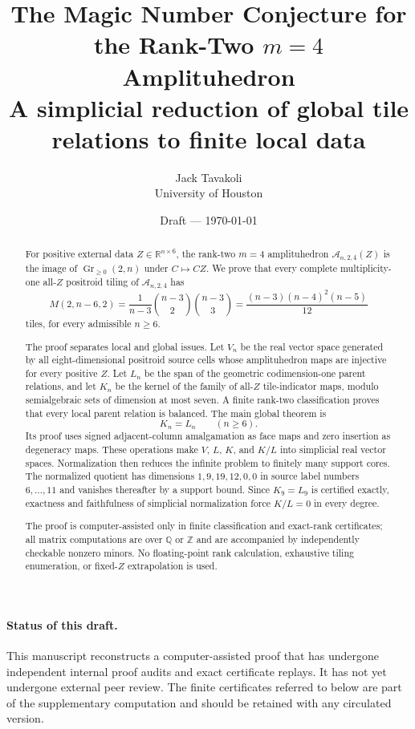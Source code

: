 \documentclass[11pt]{article}
\title{The Magic Number Conjecture for the Rank-Two $m=4$ Amplituhedron\\
\large A simplicial reduction of global tile relations to finite local data}
\author{Jack Tavakoli\\University of Houston}
\date{Draft --- \today}
\newcommand{\Gr}{\operatorname{Gr}}
\newcommand{\A}{\mathcal A}
\newcommand{\R}{\mathbb R}
\newcommand{\1}{\mathbf 1}
\begin{document}
\maketitle

\begin{abstract}
For positive external data $Z\in\R^{n\times 6}$, the rank-two $m=4$
amplituhedron $\A_{n,2,4}(Z)$ is the image of $\Gr_{\ge 0}(2,n)$ under
$C\mapsto CZ$.  We prove that every complete multiplicity-one all-$Z$
positroid tiling of $\A_{n,2,4}$ has
\[
M(2,n-6,2)
=\frac{1}{n-3}\binom{n-3}{2}\binom{n-3}{3}
=\frac{(n-3)(n-4)^2(n-5)}{12}
\]
tiles, for every admissible $n\ge 6$.

The proof separates local and global issues.  Let $V_n$ be the real vector
space generated by all eight-dimensional positroid source cells whose
amplituhedron maps are injective for every positive $Z$.  Let $L_n$ be the
span of the geometric codimension-one parent relations, and let $K_n$ be
the kernel of the family of all-$Z$ tile-indicator maps, modulo
semialgebraic sets of dimension at most seven.  A finite rank-two
classification proves that every local parent relation is balanced.  The
main global theorem is
\[
K_n=L_n\qquad(n\ge 6).
\]
Its proof uses signed adjacent-column amalgamation as face maps and zero
insertion as degeneracy maps.  These operations make $V$, $L$, $K$, and
$K/L$ into simplicial real vector spaces.  Normalization then reduces the
infinite problem to finitely many support cores.  The normalized quotient
has dimensions $1,9,19,12,0,0$ in source label numbers $6,\dots,11$ and
vanishes thereafter by a support bound.  Since $K_9=L_9$ is certified
exactly, exactness and faithfulness of simplicial normalization force
$K/L=0$ in every degree.

The proof is computer-assisted only in finite classification and exact-rank
certificates; all matrix computations are over $\mathbb Q$ or $\mathbb Z$
and are accompanied by independently checkable nonzero minors.  No
floating-point rank calculation, exhaustive tiling enumeration, or
fixed-$Z$ extrapolation is used.
\end{abstract}

\paragraph{Status of this draft.}
This manuscript reconstructs a computer-assisted proof that has undergone
independent internal proof audits and exact certificate replays.  It has
not yet undergone external peer review.  The finite certificates referred
to below are part of the supplementary computation and should be retained
with any circulated version.
\end{document}
